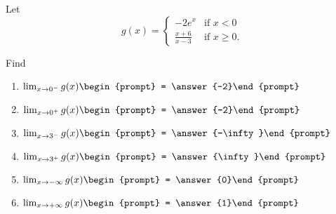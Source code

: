 \documentclass{ximera}
\author{Matthew Carr}
\begin{document}
\begin{exercise}


Let
\[
g(x)=\begin{cases}
-2e^{x} & \text{if $x<0$}\\
\frac{x+6}{x-3} & \text{if $x\ge0$}.
\end{cases}
\]

Find
\begin{enumerate}
\item		$\lim_{x\to 0^{-}} g(x)\begin{prompt} = \answer{-2}\end{prompt}$
\item		$\lim_{x\to 0^+} g(x)\begin{prompt} = \answer{-2}\end{prompt}$
\item		$\lim_{x\to 3^{-}} g(x)\begin{prompt} = \answer{-\infty}\end{prompt}$
\item		$\lim_{x\to 3^{+}} g(x)\begin{prompt} = \answer{\infty}\end{prompt}$
\item		$\lim_{x\to -\infty} g(x)\begin{prompt} = \answer{0}\end{prompt}$
\item		$\lim_{x\to +\infty} g(x)\begin{prompt} = \answer{1}\end{prompt}$
\end{enumerate}
\end{exercise}
\end{document}
